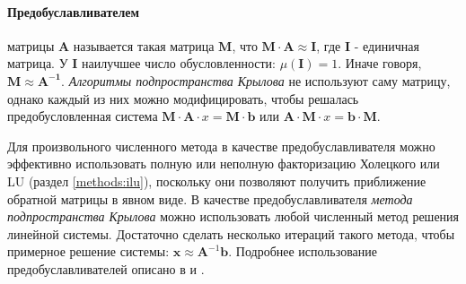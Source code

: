 \paragraph{Предобуславливателем} матрицы $\mathbf{A}$ называется такая матрица $\mathbf{M}$, что $\mathbf{M} \cdot \mathbf{A} \approx \mathbf{I}$, где $\mathbf{I}$ - единичная матрица. У $\mathbf{I}$ наилучшее число обусловленности: $\mu(\mathbf{I}) = 1$. Иначе говоря, $\mathbf{M} \approx \mathbf{A^{-1}}$. \textit{Алгоритмы подпространства Крылова} не используют саму матрицу, однако каждый из них можно модифицировать, чтобы решалась предобусловленная система $\mathbf{M} \cdot \mathbf{A} \cdot x = \mathbf{M} \cdot \mathbf{b}$ или $\mathbf{A} \cdot \mathbf{M} \cdot x = \mathbf{b} \cdot \mathbf{M} $.
\par
Для произвольного численного метода в качестве предобуславливателя можно эффективно использовать полную или неполную факторизацию Холецкого или LU (раздел \ref{methods:ilu}), поскольку они позволяют получить приближение обратной матрицы в явном виде.
В качестве предобуславливателя \textit{метода подпространства Крылова} можно использовать любой численный метод решения линейной системы. Достаточно сделать несколько итераций такого метода, чтобы примерное решение системы: $\mathbf{x} \approx \mathbf{A}^{-1} \mathbf{b}$. Подробнее использование предобуславливателей описано в \cite{Golub} и \cite{saad2003iterative}.